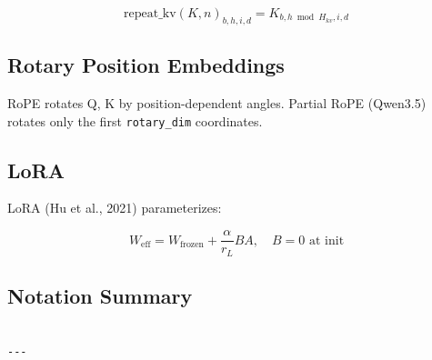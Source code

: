 \[
\text{repeat\_kv}(K, n)_{b, h, i, d} = K_{b, h \bmod H_{kv}, i, d}
\tag{3.3}
\]

\subsection{Rotary Position Embeddings}

RoPE rotates Q, K by position-dependent angles. Partial RoPE (Qwen3.5) 
rotates only the first \texttt{rotary\_dim} coordinates.

\subsection{LoRA}

LoRA (Hu et al., 2021) parameterizes:

\[
W_\text{eff} = W_\text{frozen} + \frac{\alpha}{r_L} B A, \quad B = 0 \text{ at init}
\tag{3.4}
\]

\subsection{Notation Summary}

\begin{lstlisting}

---
\end{lstlisting}